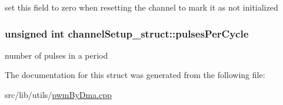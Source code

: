 set this field to zero when resetting the channel to mark it as not initialized 
\subsubsection[{\texorpdfstring{pulses\+Per\+Cycle}{pulsesPerCycle}}]{\setlength{\rightskip}{0pt plus 5cm}unsigned int channel\+Setup\+\_\+struct\+::pulses\+Per\+Cycle}\hypertarget{structchannelSetup__struct_a20356f808e59b5e3a0678493fb71ddef}{}\label{structchannelSetup__struct_a20356f808e59b5e3a0678493fb71ddef}
number of pulses in a period 

The documentation for this struct was generated from the following file\+:\begin{DoxyCompactItemize}
\item 
src/lib/utils/\hyperlink{pwmByDma_8cpp}{pwm\+By\+Dma.\+cpp}\end{DoxyCompactItemize}
